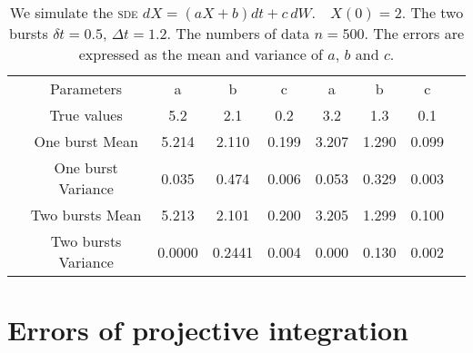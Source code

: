 \documentclass[12pt,reqno, a4paper]{article}
\numberwithin{equation}{section}
\begin{document}
\begin{table}[htbp]
  \caption{\label{tab1} We simulate the \textsc{sde}
$
dX=(aX+b)dt+c\,dW. \quad  X(0)=2.
$  The two bursts  $\delta t=0.5$, $\Delta t=1.2$. The numbers of data $n=500$.  The errors are expressed as the mean  and variance of  $a$, $b$ and $c$. }
 \begin{tabular}{ccccccccc}
  \toprule
  &Parameters & a & b &  c & a& b & c\\
  &  True values  &5.2& 2.1 &0.2 & 3.2&1.3 &0.1 \\
  \midrule
&One burst Mean& 5.214 &  2.110&  0.199& 3.207&  1.290&  0.099 \\
& One burst Variance & 0.035& 0.474 & 0.006 & 0.053 & 0.329& 0.003\\
  \midrule
&Two bursts Mean& 5.213 &  2.101& 0.200& 3.205&  1.299&  0.100 \\
& Two bursts Variance & 0.0000&  0.2441 & 0.004 & 0.000 & 0.130&  0.002\\
  \bottomrule
  \bottomrule
 \end{tabular}

\end{table}

\section{Errors of projective integration}
\end{document}
